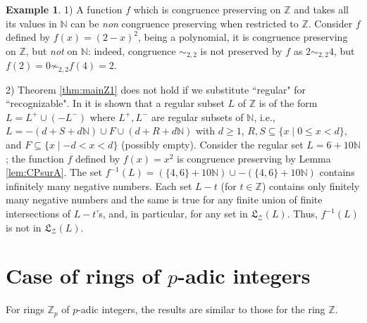 \documentclass[11pt,a4paper]{article}
\theoremstyle{definition} %
\newtheorem{example}[theorem]{Example}
\newcommand\+[1]{\mathcal{#1}} %
\newcommand{\N}{{\mathbb N}}     %
\newcommand{\Z}{{\mathbb Z}}     %
\newcommand{\Latt}{{\mathfrak{L}}}
\newcommand{\Zhat}{\widehat{\Z}}
\begin{document}
\begin{example} \label{ex:contrexRecNonRat}
1) A function $f$ which is congruence preserving on $\Z$ and takes all its values in $\N$ can be {\it non} congruence preserving when restricted to $\Z$. Consider $f$ defined by $f(x)=(2-x)^2$, being a polynomial, it is congruence preserving on $\Z$, but {\it not} on $\N$: indeed, congruence 
$\sim_{2,2}$ is not preserved by $f$ as $2\sim_{2,2} 4$, but $f(2)=0\not \sim_{2,2} f(4)=2$.

2) Theorem \ref{thm:mainZ1}  does not hold if we substitute  ``regular" for ``recognizable". In {\rm \cite{benois}\/} it is shown that a regular  subset $L$ of $\Z$ is  of the form
$L=L^+\cup (-L^-)$ where $L^+,L^-$ are regular subsets of $\N$,
i.e., $L=-(d+S+d\N)\cup F\cup(d+R+d\N)$ with
$d\geq1$,
$R,S\subseteq\{x\mid0\leq x<d\}$, and
$F\subseteq\{x\mid-d<x<d\}$
(possibly empty).
 Consider the regular set
$L= 6+10 \N$; the
  function $f$ defined by $f(x) = x^2$ is congruence preserving by Lemma \ref{lem:CPsurA}.
The set $f^{-1}(L) = (\{4,6\}+10\N)\cup -(\{4,6\}+10\N)$ 
contains infinitely many negative numbers.
Each set $L-t$ (for $t\in\Z$) contains only finitely many negative numbers
and the same is true for any finite union of finite intersections of $L-t$'s, 
and, in particular, for any set in $\Latt_\+Z(L)$.
Thus, $f^{-1}(L)$ is not in $\Latt_\+Z(L)$.
\end{example}

%
\section{Case of rings of $p$-adic  integers}%
\label{s ZpZhat}
%
For rings $\Z_p$ of $p$-adic integers, %
the results are similar to those for the ring $\Z$. %

\end{document}
